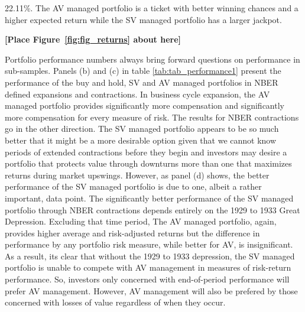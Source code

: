 22.11\%. The AV managed portfolio is a ticket with better winning chances and a higher expected return while the SV managed portfolio has a larger jackpot.

\bigskip
\centerline{\bf [Place Figure~\ref{fig:fig_returns} about here]}
\bigskip

Portfolio performance numbers always bring forward questions on performance in sub-samples. 
Panels (b) and (c) in table \ref{tab:tab_performance1} present the performance of the buy and hold, SV and AV managed portfolios in NBER defined expansions and contractions. In business cycle expansion, the AV managed portfolio provides significantly more compensation and significantly more compensation for every measure of risk. The results for NBER contractions go in the other direction. The SV managed portfolio appears to be so much better that it might be a more desirable option given that we cannot know periods of extended contractions before they begin and investors may desire a portfolio that protects value through downturns more than one that maximizes returns during market upswings. However, as panel (d) shows, the better performance of the SV managed portfolio is due to one, albeit a rather important, data point. The significantly better performance of the SV managed portfolio through NBER contractions depends entirely on the 1929 to 1933 Great Depression. Excluding that time period, The AV managed portfolio, again, provides higher average and risk-adjusted returns but the difference in performance by any portfolio risk measure, while better for AV, is insignificant. As a result, its clear that without the 1929 to 1933 depression, the SV managed portfolio is unable to compete with AV management in measures of risk-return performance. %
So, investors only concerned with end-of-period performance will prefer AV management. However, AV management will also be prefered by those concerned with losses of value regardless of when they occur.
